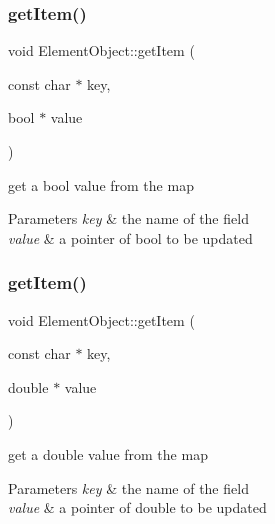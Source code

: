 \subsubsection{\texorpdfstring{get\+Item()}{getItem()}\hspace{0.1cm}{\footnotesize\ttfamily [3/7]}}
{\footnotesize\ttfamily void Element\+Object\+::get\+Item (\begin{DoxyParamCaption}\item[{const char $\ast$}]{key,  }\item[{bool $\ast$}]{value }\end{DoxyParamCaption})}

get a bool value from the map


\begin{DoxyParams}{Parameters}
{\em key} & the name of the field \\
\hline
{\em value} & a pointer of bool to be updated \\
\hline
\end{DoxyParams}
\mbox{\label{classElementObject_a114eb87b32efc8c71c3b14bfc9d121ce}} 
\subsubsection{\texorpdfstring{get\+Item()}{getItem()}\hspace{0.1cm}{\footnotesize\ttfamily [4/7]}}
{\footnotesize\ttfamily void Element\+Object\+::get\+Item (\begin{DoxyParamCaption}\item[{const char $\ast$}]{key,  }\item[{double $\ast$}]{value }\end{DoxyParamCaption})}

get a double value from the map


\begin{DoxyParams}{Parameters}
{\em key} & the name of the field \\
\hline
{\em value} & a pointer of double to be updated \\
\hline
\end{DoxyParams}
\mbox{\label{classElementObject_a83b8a7f1230171e12f8f3a12326f32a2}} 

